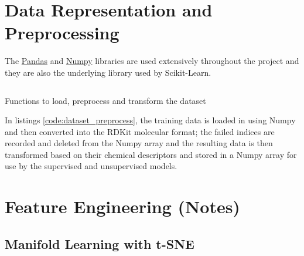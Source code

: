 \documentclass[a4paper,12pt]{report}
\begin{document}
	\section{Data Representation and Preprocessing}
	The \href{http://pandas.pydata.org/}{Pandas} and \href{http://www.numpy.org/}{Numpy} libraries are used extensively throughout the project and they are also the underlying library used by Scikit-Learn. 
		\begin{listing}[!htbp]
			\inputminted[breaklines=true,breakautoindent=true,linenos=true]{python}{source_code/dataset.py}
			\caption{Functions to load, preprocess and transform the dataset}
			\label{code:dataset_preprocess}
		\end{listing}
	In listings \ref{code:dataset_preprocess}, the training data is loaded in using Numpy and then converted into the RDKit molecular format; the failed indices are recorded and deleted from the Numpy array and the resulting data is then transformed based on their chemical descriptors and stored in a Numpy array for use by the supervised and unsupervised models.
	
	\section{Feature Engineering (Notes)}
		\subsection{Manifold Learning with t-SNE}
\end{document}
